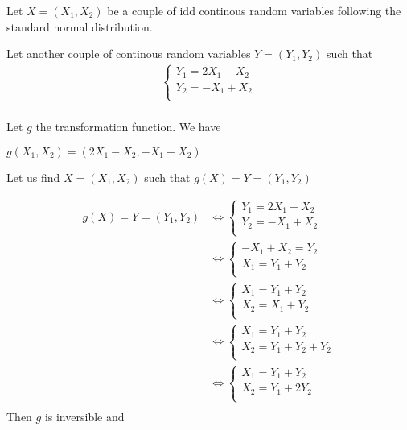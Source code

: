 \documentclass[11pt]{article}
\begin{document}
Let $X=(X_1,X_2)$ be a couple of idd continous random variables following the standard normal distribution.

Let another couple of continous random variables $Y=(Y_1,Y_2)$ such that  
\begin{align*}
\begin{cases}
            Y_1=2X_1-X_2  \\
            Y_2=-X_1+X_2\\ 
        \end{cases}   \\
\end{align*}

Let $g$ the transformation function. We have

$g(X_1,X_2)=(2X_1-X_2,-X_1+X_2)$

Let  us find $X=(X_1,X_2)$ such that $g(X)=Y=(Y_1,Y_2)$

\begin{align*}
g(X)=Y=(Y_1,Y_2) 
& \iff \begin{cases}
            Y_1=2X_1-X_2  \\
            Y_2=-X_1+X_2\\ 
        \end{cases}   \\        
& \iff \begin{cases}
            -X_1+X_2=Y_2  \\
            X_1=Y_1+Y_2\\ 
        \end{cases}   \\        
& \iff \begin{cases}
            X_1=Y_1+Y_2 \\
            X_2=X_1+Y_2\\ 
        \end{cases}   \\
& \iff \begin{cases}
            X_1=Y_1+Y_2 \\
            X_2=Y_1+Y_2+Y_2\\ 
        \end{cases}   \\
& \iff \begin{cases}
            X_1=Y_1+Y_2 \\
            X_2=Y_1+2Y_2\\ 
        \end{cases}   \\
\end{align*}
Then $g$ is inversible and 
\end{document}
